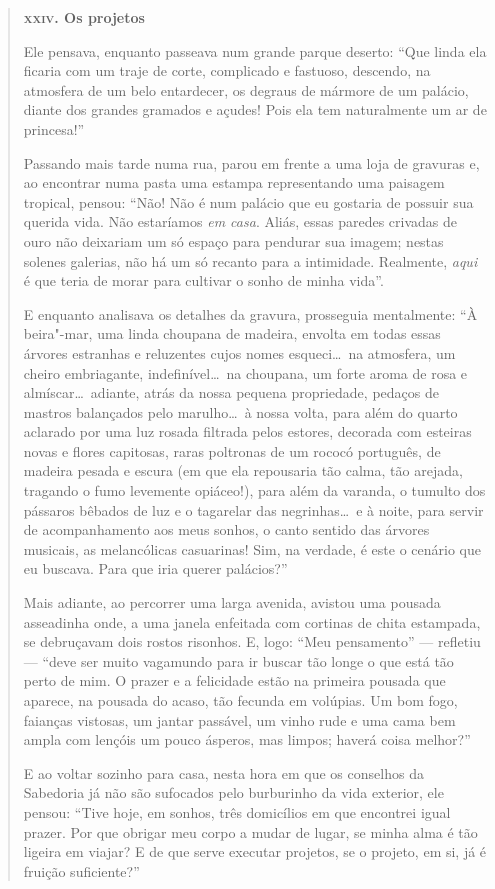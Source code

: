 \documentclass[12pt]{extarticle}
\begin{document}
\begin{quote}
\dotfill

\textbf{\textsc{xxiv.} Os projetos}\medskip

Ele pensava, enquanto passeava num grande parque deserto:
``Que linda ela ficaria com um traje de corte, complicado
e fastuoso, descendo, na atmosfera de um belo entardecer, os
degraus de mármore de um palácio, diante dos grandes gramados e açudes!
Pois ela tem naturalmente um ar de princesa!''

Passando mais tarde numa rua, parou em frente a uma loja de gravuras
e, ao encontrar numa pasta uma estampa representando uma paisagem
tropical, pensou: ``Não! Não é num palácio que eu gostaria
de possuir sua querida vida. Não estaríamos \textit{em casa}. Aliás, essas
paredes crivadas de ouro não deixariam um só espaço para pendurar sua
imagem; nestas solenes galerias, não há um só recanto para a
intimidade. Realmente, \textit{aqui} é que teria de morar para cultivar
o sonho de minha vida''.

E enquanto analisava os detalhes da gravura, prosseguia mentalmente:
``À beira"-mar, uma linda choupana de madeira, envolta
em todas essas árvores estranhas e reluzentes cujos nomes esqueci\ldots\ 
na atmosfera, um cheiro embriagante, indefinível\ldots\  na choupana, um
forte aroma de rosa e almíscar\ldots\  adiante, atrás da nossa
pequena propriedade, pedaços de mastros balançados pelo marulho\ldots\  à nossa volta, para além do quarto aclarado por uma luz rosada filtrada
pelos estores, decorada com esteiras novas e flores capitosas, raras poltronas de um rococó português, de madeira pesada e escura (em
que ela repousaria tão calma, tão arejada, tragando o fumo
levemente opiáceo!), para além da varanda, o tumulto dos pássaros bêbados de
luz e o tagarelar das negrinhas\ldots\  e à noite, para servir de
acompanhamento aos meus sonhos, o canto sentido das árvores musicais,
as melancólicas casuarinas! Sim, na verdade, é este o cenário que eu
buscava. Para que iria querer palácios?''

Mais adiante, ao percorrer uma larga avenida, avistou uma pousada
asseadinha onde, a uma janela enfeitada com cortinas de chita
estampada, se debruçavam dois rostos risonhos. E, logo:
``Meu pensamento'' --- refletiu --- ``deve ser muito vagamundo
para ir buscar tão longe o que está tão perto de mim. O prazer e a
felicidade estão na primeira pousada que aparece, na pousada do
acaso, tão fecunda em volúpias. Um bom fogo, faianças vistosas, um
jantar passável, um vinho rude e uma cama bem ampla com lençóis um
pouco ásperos, mas limpos; haverá coisa melhor?''

E ao voltar sozinho para casa, nesta hora em que os conselhos da
Sabedoria já não são sufocados pelo burburinho da vida exterior,
ele pensou: ``Tive hoje, em sonhos, três domicílios em que
encontrei igual prazer. Por que obrigar meu corpo a mudar de lugar, 
se minha alma é tão ligeira em viajar? E de que serve executar projetos,
se o projeto, em si, já é fruição suficiente?''

\dotfill
\end{quote}
\end{document}
